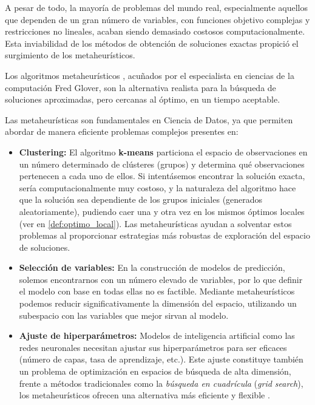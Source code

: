 \documentclass[12pt,a4paper]{book}
\begin{document}
A pesar de todo, la mayoría de problemas del mundo real, especialmente aquellos que dependen de un gran número de variables, con funciones objetivo complejas y restricciones no lineales, acaban siendo demasiado costosos computacionalmente. Esta inviabilidad de los métodos de obtención de soluciones exactas propició el surgimiento de los metaheurísticos.

Los algoritmos metaheurísticos \cite{metaheuristicos}, acuñados por el especialista en ciencias de la computación Fred Glover,
son la alternativa realista para la búsqueda de soluciones aproximadas, pero cercanas al óptimo, en un tiempo aceptable.

Las metaheurísticas son fundamentales en Ciencia de Datos, ya que permiten abordar de manera eficiente problemas complejos presentes en:

\begin{itemize}
    \item \textbf{Clustering:} El algoritmo \textbf{k-means} \cite{k-means} particiona el espacio de observaciones en un número determinado de clústeres (grupos) y determina qué observaciones pertenecen a cada uno de ellos. 
    Si intentásemos encontrar la solución exacta, sería computacionalmente muy costoso, y la naturaleza del algoritmo hace que la solución sea dependiente de los grupos iniciales (generados aleatoriamente), pudiendo caer una y otra vez en los mismos óptimos locales (ver en \ref{def:optimo_local}).
    Las metaheurísticas ayudan a solventar estos problemas al proporcionar estrategias más robustas de exploración del espacio de soluciones.
    
    \item \textbf{Selección de variables:} En la construcción de modelos de predicción, solemos encontrarnos con un número elevado de variables, por lo que definir el modelo con base en todas ellas no es factible. Mediante metaheurísticos podemos 
    reducir significativamente la dimensión del espacio, utilizando un subespacio con las variables que mejor sirvan al modelo.
    
    \item \textbf{Ajuste de hiperparámetros:} Modelos de inteligencia artificial como las redes neuronales necesitan ajustar sus hiperparámetros para ser eficaces (número de capas, tasa de aprendizaje, etc.). Este ajuste constituye también un problema de optimización en espacios de búsqueda de alta dimensión, frente a métodos tradicionales como la \textit{búsqueda en cuadrícula} (\textit{grid search}), los metaheurísticos ofrecen una alternativa más eficiente y flexible \cite{hyperparameters}.
\end{itemize}
\end{document}
